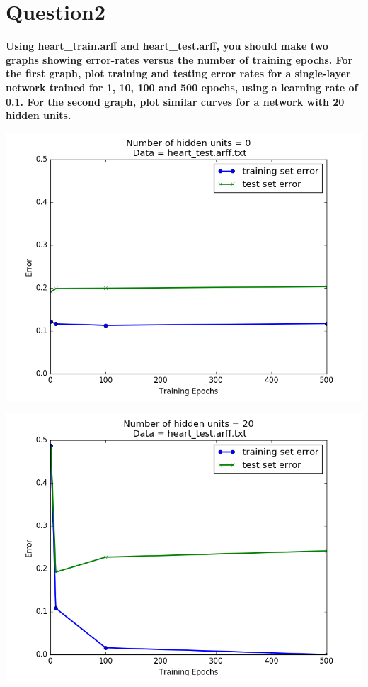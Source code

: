 \documentclass[paper=a4, fontsize=11pt]{scrartcl} %
\numberwithin{equation}{section} %
\numberwithin{figure}{section} %
\numberwithin{table}{section} %
\begin{document}
\section*{Question2}
\textbf{Using heart\_train.arff and heart\_test.arff, you should make two graphs showing error-rates versus the number of training epochs. For the first graph, plot training and testing error rates for a single-layer network trained for 1, 10, 100 and 500 epochs, using a learning rate of 0.1. For the second graph, plot similar curves for a network with 20 hidden units. }
\begin{center}
\includegraphics[scale=.45]{pics/learningCurve_noHidden.png}
\end{center}
\begin{center}
\includegraphics[scale=.45]{pics/learningCurve_hidden.png}
\end{center}
\end{document}
